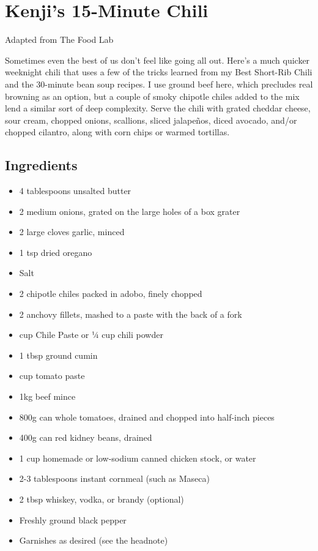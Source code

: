 \clearpage
\section{Kenji's 15-Minute Chili}


Adapted from The Food Lab

Sometimes even the best of us don’t feel like going all out. Here’s a much quicker weeknight chili that uses a few of the tricks learned from my Best Short-Rib Chili and the 30-minute bean soup recipes. I use ground beef here, which precludes real browning as an option, but a couple of smoky chipotle chiles added to the mix lend a similar sort of deep complexity. Serve the chili with grated cheddar cheese, sour cream, chopped onions, scallions, sliced jalapeños, diced avocado, and/or chopped cilantro, along with corn chips or warmed tortillas.

\subsection{Ingredients}

\begin{itemize}
	\item 4 tablespoons unsalted butter
	\item 2 medium onions, grated on the large holes of a box grater
	\item 2 large cloves garlic, minced
	\item 1 tsp dried oregano
	\item Salt
	\item 2 chipotle chiles packed in adobo, finely chopped
	\item 2 anchovy fillets, mashed to a paste with the back of a fork
	\item {} cup Chile Paste or 1⁄4 cup chili powder
	\item 1 tbsp ground cumin
	\item {} cup tomato paste
	\item 1kg beef mince
	\item 800g can whole tomatoes, drained and chopped into half-inch pieces
	\item 400g can red kidney beans, drained
	\item 1 cup homemade or low-sodium canned chicken stock, or water
	\item 2-3 tablespoons instant cornmeal (such as Maseca)
	\item 2 tbsp whiskey, vodka, or brandy (optional)
	\item Freshly ground black pepper
	\item Garnishes as desired (see the headnote) 
\end{itemize}

